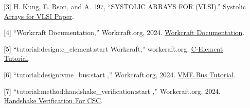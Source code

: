 \documentclass[a4paper,12pt]{article}
\begin{document}
[3] H. Kung, E. Rson, and A. 197, ``SYSTOLIC ARRAYS FOR (VLSI).” \href{https://www.eecs.harvard.edu/htk/static/files/1978-cmu-cs-report-kung-leiserson.pdf}{Systolic Arrays for VLSI Paper}.

[4] ``Workcraft Documentation,” Workcraft.org, 2024. \href{https://workcraft.org/documentation/}{Workcraft Documentation}.  

[5] ``tutorial:design:c\_element:start \- Workcraft,” workcraft.org. \href{https://workcraft.org/tutorial/design/c_element/start}{C-Element Tutorial}.

[6] ``tutorial:design:vme\_bus:start \- [Workcraft],” Workcraft.org, 2024. \href{https://workcraft.org/tutorial/design/vme_bus/start}{VME Bus Tutorial}.

[7] ``tutorial:method:handshake\_verification:start \- [Workcraft],” Workcraft.org, 2024. \href{https://workcraft.org/tutorial/method/handshake_verification/start}{Handshake Verification For CSC}.
\end{document}
